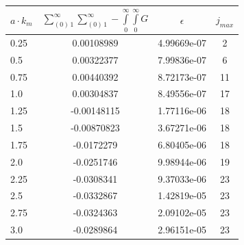 \documentclass[twoside, 10pt]{article}
\begin{document}
\begin{multicols}{2}
\noindent
    \begin{center}
\begin{tabular}{ | l | c | c | c | }
\hline
$a \cdot k_m$ & $\sum\limits_{\left(0\right)\,1}^{\infty}\sum\limits_{\left(0\right)\,1}^{\infty}-\int\limits_{0}^{\infty}\int\limits_{0}^{\infty}G$ & $\epsilon$ & $j_{max}$ \\
\hline
0.25 & 0.00108989 & 4.99669e-07 & 2 \\
0.5 & 0.00322377 & 7.99836e-07 & 6 \\
0.75 & 0.00440392 & 8.72173e-07 & 11 \\
1.0 & 0.00304837 & 8.49556e-07 & 17 \\
1.25 & -0.00148115 & 1.77116e-06 & 18 \\
1.5 & -0.00870823 & 3.67271e-06 & 18 \\
1.75 & -0.0172279 & 6.80405e-06 & 18 \\
2.0 & -0.0251746 & 9.98944e-06 & 19 \\
2.25 & -0.0308341 & 9.37033e-06 & 23 \\
2.5 & -0.0332867 & 1.42819e-05 & 23 \\
2.75 & -0.0324363 & 2.09102e-05 & 23 \\
3.0 & -0.0289864 & 2.96151e-05 & 23 \\



\end{tabular}
\end{center}
\end{multicols}
\end{document}

